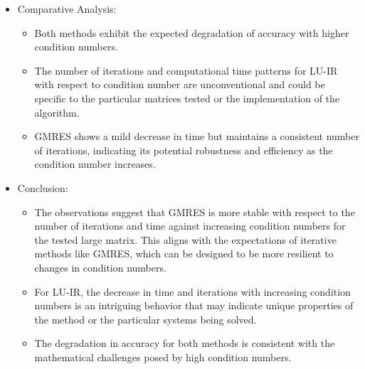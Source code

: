 \begin{enumerate}
\begin{itemize}
\begin{itemize}
        \end{itemize}
        \item Comparative Analysis:
        \begin{itemize}
            \item  Both methods exhibit the expected degradation of accuracy with higher condition numbers.
            \item The number of iterations and computational time patterns for LU-IR with respect to condition number are unconventional and could be specific to the particular matrices tested or the implementation of the algorithm.
            \item GMRES shows a mild decrease in time but maintains a consistent number of iterations, indicating its potential robustness and efficiency as the condition number increases.
        \end{itemize}
        \item Conclusion:
        \begin{itemize}
            \item The observations suggest that GMRES is more stable with respect to the number of iterations and time against increasing condition numbers for the tested large matrix. This aligns with the expectations of iterative methods like GMRES, which can be designed to be more resilient to changes in condition numbers.
           \item For LU-IR, the decrease in time and iterations with increasing condition numbers is an intriguing behavior that may indicate unique properties of the method or the particular systems being solved.
           \item The degradation in accuracy for both methods is consistent with the mathematical challenges posed by high condition numbers.
        \end{itemize}
        

\end{itemize}
\end{enumerate}
